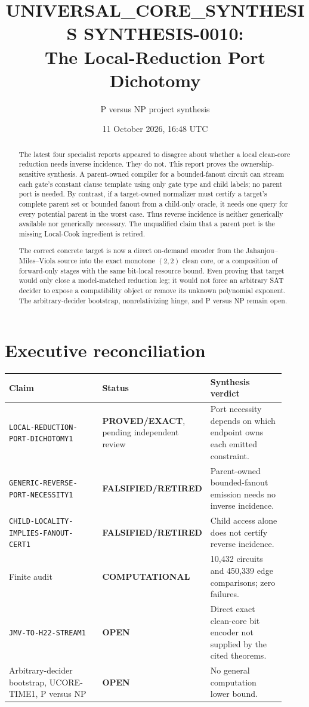 \documentclass[11pt]{article}
\title{UNIVERSAL\_CORE\_SYNTHESIS SYNTHESIS-0010:\\
The Local-Reduction Port Dichotomy}
\author{P versus NP project synthesis}
\date{11 October 2026, 16:48 UTC}
\newcommand{\EXACT}{\textbf{PROVED/EXACT}}
\newcommand{\OPEN}{\textbf{OPEN}}
\newcommand{\RETIRED}{\textbf{FALSIFIED/RETIRED}}
\newcommand{\COMP}{\textbf{COMPUTATIONAL}}
\begin{document}
\maketitle

\begin{abstract}
The latest four specialist reports appeared to disagree about whether a
local clean-core reduction needs inverse incidence.  They do not.  This
report proves the ownership-sensitive synthesis.  A parent-owned compiler
for a bounded-fanout circuit can stream each gate's constant clause template
using only gate type and child labels; no parent port is needed.  By contrast,
if a target-owned normalizer must certify a target's complete parent set or
bounded fanout from a child-only oracle, it needs one query for every
potential parent in the worst case.  Thus reverse incidence is neither
generically available nor generically necessary.  The unqualified claim
that a parent port is the missing Local-Cook ingredient is retired.

The correct concrete target is now a direct on-demand encoder from the
Jahanjou--Miles--Viola source into the exact monotone $(2,2)$ clean core, or a
composition of forward-only stages with the same bit-local resource bound.
Even proving that target would only close a model-matched reduction leg; it
would not force an arbitrary SAT decider to expose a compatibility object or
remove its unknown polynomial exponent.  The arbitrary-decider bootstrap,
nonrelativizing hinge, and P versus NP remain open.
\end{abstract}

\section{Executive reconciliation}

\begin{center}
\small
\begin{tabular}{@{}p{0.42\linewidth}p{0.19\linewidth}p{0.31\linewidth}@{}}
\toprule
Claim & Status & Synthesis verdict\\
\midrule
\texttt{LOCAL-REDUCTION-PORT-DICHOTOMY1} & \EXACT, pending independent review &
Port necessity depends on which endpoint owns each emitted constraint.\\
\texttt{GENERIC-REVERSE-PORT-NECESSITY1} & \RETIRED &
Parent-owned bounded-fanout emission needs no inverse incidence.\\
\texttt{CHILD-LOCALITY-IMPLIES-FANOUT-CERT1} & \RETIRED &
Child access alone does not certify reverse incidence.\\
Finite audit & \COMP & 10,432 circuits and 450,339 edge comparisons; zero failures.\\
\texttt{JMV-TO-H22-STREAM1} & \OPEN &
Direct exact clean-core bit encoder not supplied by the cited theorems.\\
Arbitrary-decider bootstrap, UCORE-TIME1, P versus NP & \OPEN &
No general computation lower bound.\\
\bottomrule
\end{tabular}
\end{center}
\end{document}
